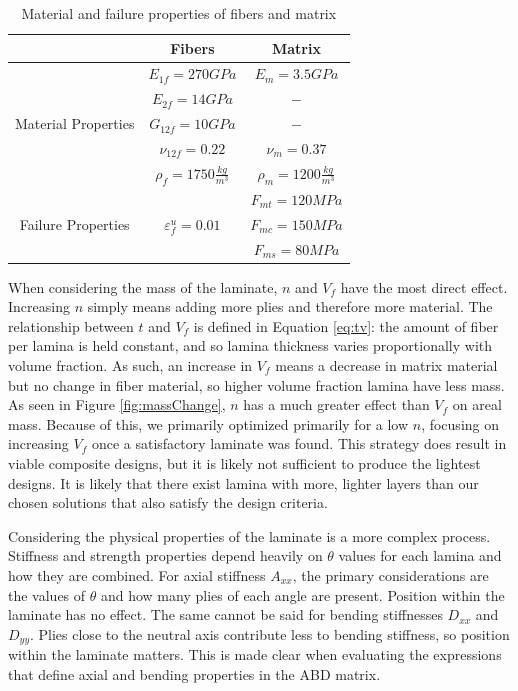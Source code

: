 \documentclass[12pt]{article}
\begin{document}
\begin{table}[H]
    \centering
    \begin{tabular}{|c|c|c|}
        \hline
         & Fibers & Matrix\\
         \hline
         & $E_{1f}=270GPa$ & $E_m=3.5 GPa$\\
         & $E_{2f}=14 GPa$ & $-$\\
        Material Properties & $G_{12f}=10 GPa$ & $-$\\
         & $\nu_{12f}=0.22$ & $\nu_m=0.37$\\
         &  $\rho_f=1750\frac{kg}{m^3}$& $\rho_m=1200\frac{kg}{m^3}$\\
         \hline
         & & $F_{mt}=120 MPa$\\
        Failure Properties & $\varepsilon_f^u=0.01$ & $F_{mc}=150 MPa$\\
         & & $F_{ms}=80 MPa$\\
         \hline 
    \end{tabular}
    \caption{Material and failure properties of fibers and matrix}
    \label{tab:matprop}
\end{table}

When considering the mass of the laminate, $n$ and $V_f$ have the most direct effect. Increasing $n$ simply means adding more plies and therefore more material. The relationship between $t$ and $V_f$ is defined in Equation \ref{eq:tv}: the amount of fiber per lamina is held constant, and so lamina thickness varies proportionally with volume fraction. As such, an increase in $V_f$ means a decrease in matrix material but no change in fiber material, so higher volume fraction lamina have less mass. As seen in Figure \ref{fig:massChange}, $n$ has a much greater effect than $V_f$ on areal mass. Because of this, we primarily optimized primarily for a low $n$, focusing on increasing $V_f$ once a satisfactory laminate was found. This strategy does result in viable composite designs, but it is likely not sufficient to produce the lightest designs. It is likely that there exist lamina with more, lighter layers than our chosen solutions that also satisfy the design criteria.

Considering the physical properties of the laminate is a more complex process. Stiffness and strength properties depend heavily on $\theta$ values for each lamina and how they are combined. For axial stiffness $A_{xx}$, the primary considerations are the values of $\theta$ and how many plies of each angle are present. Position within the laminate has no effect. The same cannot be said for bending stiffnesses $D_{xx}$ and $D_{yy}$. Plies close to the neutral axis contribute less to bending stiffness, so position within the laminate matters. This is made clear when evaluating the expressions that define axial and bending properties in the ABD matrix. 
\end{document}
